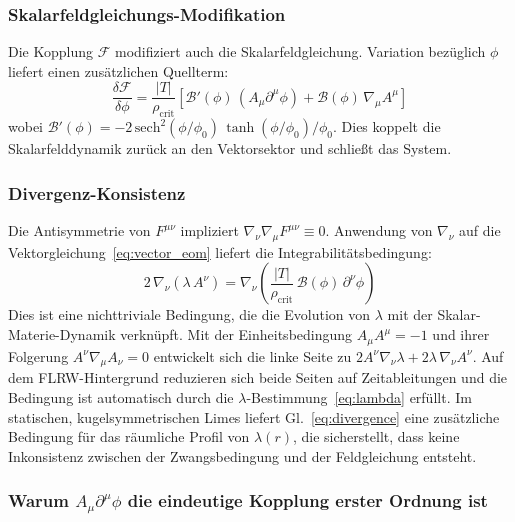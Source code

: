 \documentclass[aps,prd,twocolumn,superscriptaddress,nofootinbib]{revtex4-2}
\begin{document}
\subsubsection{Skalarfeldgleichungs-Modifikation}

Die Kopplung $\mathcal{F}$ modifiziert auch die Skalarfeldgleichung. Variation bez\"uglich $\phi$ liefert einen zus\"atzlichen Quellterm:
\begin{equation}
\frac{\delta\mathcal{F}}{\delta\phi} = \frac{|T|}{\rho_{\mathrm{crit}}}\left[\mathcal{B}'(\phi)\,(A_\mu\partial^\mu\phi) + \mathcal{B}(\phi)\,\nabla_\mu A^\mu\right]
\label{eq:scalar_source}
\end{equation}
wobei $\mathcal{B}'(\phi) = -2\,\mathrm{sech}^2(\phi/\phi_0)\,\tanh(\phi/\phi_0)/\phi_0$. Dies koppelt die Skalarfelddynamik zur\"uck an den Vektorsektor und schlie\ss{}t das System.

\subsubsection{Divergenz-Konsistenz}

Die Antisymmetrie von $F^{\mu\nu}$ impliziert $\nabla_\nu\nabla_\mu F^{\mu\nu} \equiv 0$. Anwendung von $\nabla_\nu$ auf die Vektorgleichung~\eqref{eq:vector_eom} liefert die Integrabilit\"atsbedingung:
\begin{equation}
2\,\nabla_\nu(\lambda\,A^\nu) = \nabla_\nu\!\left(\frac{|T|}{\rho_{\mathrm{crit}}}\,\mathcal{B}(\phi)\,\partial^\nu\phi\right)
\label{eq:divergence}
\end{equation}
Dies ist eine nichttriviale Bedingung, die die Evolution von $\lambda$ mit der Skalar-Materie-Dynamik verkn\"upft. Mit der Einheitsbedingung $A_\mu A^\mu = -1$ und ihrer Folgerung $A^\nu\nabla_\mu A_\nu = 0$ entwickelt sich die linke Seite zu $2A^\nu\nabla_\nu\lambda + 2\lambda\,\nabla_\nu A^\nu$. Auf dem FLRW-Hintergrund reduzieren sich beide Seiten auf Zeitableitungen und die Bedingung ist automatisch durch die $\lambda$-Bestimmung~\eqref{eq:lambda} erf\"ullt. Im statischen, kugelsymmetrischen Limes liefert Gl.~\eqref{eq:divergence} eine zus\"atzliche Bedingung f\"ur das r\"aumliche Profil von $\lambda(r)$, die sicherstellt, dass keine Inkonsistenz zwischen der Zwangsbedingung und der Feldgleichung entsteht.

\subsubsection{Warum $A_\mu\partial^\mu\phi$ die eindeutige Kopplung erster Ordnung ist}
\end{document}
